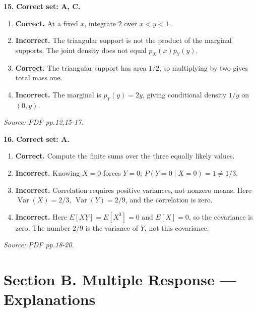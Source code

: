 \documentclass[11pt,a4paper]{article}
\begin{document}
\par\noindent\begin{minipage}{\linewidth}
\textbf{15.} \textbf{Correct set: A, C.}
\begin{enumerate}[label=(\Alph*),leftmargin=8mm,itemsep=2pt,topsep=2pt]
\item \textbf{Correct.} At a fixed \(x\), integrate \(2\) over \(x<y<1\).
\item \textbf{Incorrect.} The triangular support is not the product of the marginal supports. The joint density does not equal \(p_X(x)p_Y(y)\).
\item \textbf{Correct.} The triangular support has area \(1/2\), so multiplying by two gives total mass one.
\item \textbf{Incorrect.} The marginal is \(p_Y(y)=2y\), giving conditional density \(1/y\) on \((0,y)\).
\end{enumerate}
{\footnotesize\textit{Source: PDF pp.12,15-17.}}

\end{minipage}\par\vspace{3mm}
\par\noindent\begin{minipage}{\linewidth}
\textbf{16.} \textbf{Correct set: A.}
\begin{enumerate}[label=(\Alph*),leftmargin=8mm,itemsep=2pt,topsep=2pt]
\item \textbf{Correct.} Compute the finite sums over the three equally likely values.
\item \textbf{Incorrect.} Knowing \(X=0\) forces \(Y=0\); \(P(Y=0\mid X=0)=1\ne1/3\).
\item \textbf{Incorrect.} Correlation requires positive variances, not nonzero means. Here \(\operatorname{Var}(X)=2/3\), \(\operatorname{Var}(Y)=2/9\), and the correlation is zero.
\item \textbf{Incorrect.} Here \(E[XY]=E[X^3]=0\) and \(E[X]=0\), so the covariance is zero. The number \(2/9\) is the variance of \(Y\), not this covariance.
\end{enumerate}
{\footnotesize\textit{Source: PDF pp.18-20.}}

\end{minipage}\par\vspace{3mm}
\newpage\section*{Section B. Multiple Response --- Explanations}
\end{document}
